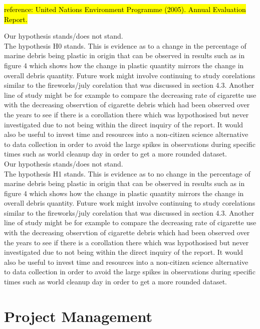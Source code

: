 \documentclass[10pt]{article}\usepackage[]{graphicx}\usepackage[]{color}
\begin{document}
\hl{reference: United Nations Environment Programme (2005). Annual Evaluation Report.}


Our hypothesis stands/does not stand.\\
The hypothesis H0 stands. This is evidence as to a change in the percentage of marine debris being plastic in origin that can be observed in results such as in figure 4 which shows how the change in plastic quantity mirrors the change in overall debris quantity.  
Future work might involve continuing to study corelations similar to the fireworks/july corelation that was discussed in section 4.3. Another line of study might be for example to compare the decreasing rate of cigarette use with the decreasing observtion of cigarette debris which had been observed over the years to see if there is a corollation there which was hypothosised but never investigated due to not being within the direct inquiry of the report. It would also be useful to invest time and resources into a non-citizen science alternative to data collection in order to avoid the large spikes in observations during specific times such as world cleanup day in order to get a more rounded dataset.   \\  

Our hypothesis stands/does not stand.\\
The hypothesis H1 stands. This is evidence as to no change in the percentage of marine debris being plastic in origin that can be observed in results such as in figure 4 which shows how the change in plastic quantity mirrors the change in overall debris quantity.  
Future work might involve continuing to study corelations similar to the fireworks/july corelation that was discussed in section 4.3. Another line of study might be for example to compare the decreasing rate of cigarette use with the decreasing observtion of cigarette debris which had been observed over the years to see if there is a corollation there which was hypothosised but never investigated due to not being within the direct inquiry of the report. It would also be useful to invest time and resources into a non-citizen science alternative to data collection in order to avoid the large spikes in observations during specific times such as world cleanup day in order to get a more rounded dataset.\\     


\pagebreak
\section{Project Management}\label{mgt}
\end{document}
